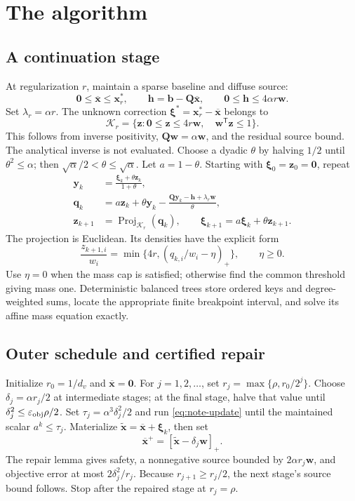 \section{The algorithm}
\label{sec:note-algorithm}
\subsection{A continuation stage}
At regularization $r$, maintain a sparse baseline and diffuse source:
\[
 \bm{0}\le\overline{\bm{x}}\le\bm{x}_r^*,\qquad
 \bm{h}=\bm{b}-\bm{Q}\overline{\bm{x}},\qquad
 \bm{0}\le\bm{h}\le4\alpha r\bm{w}.
\]
Set $\lambda_r=\alpha r$. The unknown correction
$\bm{\xi}^*=\bm{x}_r^*-\overline{\bm{x}}$ belongs to
\[
 \mathcal K_r=\{\bm{z}:\bm{0}\le\bm{z}\le4r\bm{w},\quad
                       \bm{w}^{\mathsf T}\bm{z}\le1\}.
\]
This follows from inverse positivity, $\bm{Q}\bm{w}=\alpha\bm{w}$,
and the residual source bound. The analytical inverse is not evaluated.
Choose a dyadic $\theta$ by halving $1/2$ until $\theta^2\le\alpha$;
then $\sqrt\alpha/2<\theta\le\sqrt\alpha$. Let $a=1-\theta$.
Starting with $\bm{\xi}_0=\bm{z}_0=\bm{0}$, repeat
\begin{align}
 \bm{y}_k&=\frac{\bm{\xi}_k+\theta\bm{z}_k}{1+\theta},\nonumber\\
 \bm{q}_k&=a\bm{z}_k+\theta\bm{y}_k
       -\frac{\bm{Q}\bm{y}_k-\bm{h}+\lambda_r\bm{w}}{\theta},\nonumber\\
 \bm{z}_{k+1}&=\operatorname{Proj}_{\mathcal K_r}(\bm{q}_k),
       \qquad
 \bm{\xi}_{k+1}=a\bm{\xi}_k+\theta\bm{z}_{k+1}.
 \label{eq:note-update}
\end{align}
The projection is Euclidean. Its densities have the explicit form
\[
 \frac{z_{k+1,i}}{w_i}
 =\min\{4r,(q_{k,i}/w_i-\eta)_+\},\qquad \eta\ge0.
\]
Use $\eta=0$ when the mass cap is satisfied; otherwise find the common
threshold giving mass one. Deterministic balanced trees store ordered keys
and degree-weighted sums, locate the appropriate finite breakpoint interval,
and solve its affine mass equation exactly.

\subsection{Outer schedule and certified repair}
Initialize $r_0=1/d_v$ and $\overline{\bm{x}}=\bm{0}$.
For $j=1,2,\ldots$, set $r_j=\max\{\rho,r_0/2^j\}$.
Choose $\delta_j=\alpha r_j/2$ at intermediate stages; at the final stage,
halve that value until $\delta_j^2\le\varepsilon_{\mathrm{obj}}\rho/2$.
Set $\tau_j=\alpha^3\delta_j^2/2$ and run
\eqref{eq:note-update} until the maintained scalar $a^k\le\tau_j$.
Materialize $\widetilde{\bm{x}}=\overline{\bm{x}}+\bm{\xi}_k$, then set
\[
 \overline{\bm{x}}^{+}=[\widetilde{\bm{x}}-\delta_j\bm{w}]_+.
\]
The repair lemma gives safety, a nonnegative source bounded by
$2\alpha r_j\bm{w}$, and objective error at most $2\delta_j^2/r_j$.
Because $r_{j+1}\ge r_j/2$, the next stage's source bound follows.
Stop after the repaired stage at $r_j=\rho$.

